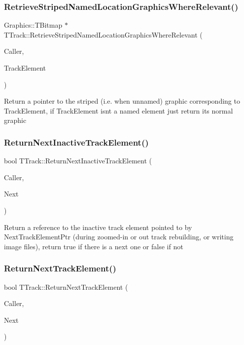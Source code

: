 \subsubsection{\texorpdfstring{Retrieve\+Striped\+Named\+Location\+Graphics\+Where\+Relevant()}{RetrieveStripedNamedLocationGraphicsWhereRelevant()}}
{\footnotesize\ttfamily Graphics\+::\+T\+Bitmap $\ast$ T\+Track\+::\+Retrieve\+Striped\+Named\+Location\+Graphics\+Where\+Relevant (\begin{DoxyParamCaption}\item[{int}]{Caller,  }\item[{\mbox{\hyperlink{class_t_track_element}{T\+Track\+Element}}}]{Track\+Element }\end{DoxyParamCaption})}

Return a pointer to the striped (i.\+e. when unnamed) graphic corresponding to Track\+Element, if Track\+Element isn\textquotesingle{}t a named element just return its normal graphic \mbox{\label{class_t_track_a58a2afacadd0f564b474ac0faabc88d4}} 
\subsubsection{\texorpdfstring{Return\+Next\+Inactive\+Track\+Element()}{ReturnNextInactiveTrackElement()}}
{\footnotesize\ttfamily bool T\+Track\+::\+Return\+Next\+Inactive\+Track\+Element (\begin{DoxyParamCaption}\item[{int}]{Caller,  }\item[{\mbox{\hyperlink{class_t_track_element}{T\+Track\+Element}} \&}]{Next }\end{DoxyParamCaption})}

Return a reference to the inactive track element pointed to by Next\+Track\+Element\+Ptr (during zoomed-\/in or out track rebuilding, or writing image files), return true if there is a next one or false if not \mbox{\label{class_t_track_a90e1db27659603b72a703c017ee576c8}} 
\subsubsection{\texorpdfstring{Return\+Next\+Track\+Element()}{ReturnNextTrackElement()}}
{\footnotesize\ttfamily bool T\+Track\+::\+Return\+Next\+Track\+Element (\begin{DoxyParamCaption}\item[{int}]{Caller,  }\item[{\mbox{\hyperlink{class_t_track_element}{T\+Track\+Element}} \&}]{Next }\end{DoxyParamCaption})}

